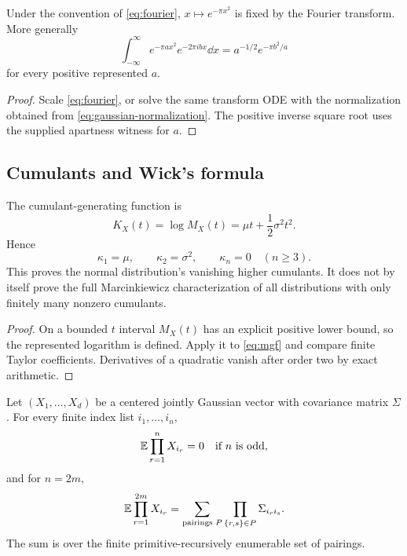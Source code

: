 \begin{corollary}\label{cor:self-fourier}
Under the convention of \eqref{eq:fourier}, $x\mapsto e^{-\pi x^2}$ is fixed by the Fourier transform.  More generally
\[
 \int_{-\infty}^{\infty}e^{-\pi a x^2}e^{-2\pi ibx}\dd x
 =a^{-1/2}e^{-\pi b^2/a}
\]
for every positive represented $a$.
\end{corollary}

\begin{proof}
Scale \eqref{eq:fourier}, or solve the same transform ODE with the normalization obtained from \eqref{eq:gaussian-normalization}.  The positive inverse square root uses the supplied apartness witness for $a$.
\end{proof}

\subsection{Cumulants and Wick's formula}

\begin{corollary}[Cumulants]\label{cor:cumulants}
The cumulant-generating function is
\begin{equation}\label{eq:cgf}
 K_X(t)=\log M_X(t)=\mu t+\frac12\sigma^2t^2.
\end{equation}
Hence
\[
 \kappa_1=\mu,\qquad \kappa_2=\sigma^2,
 \qquad \kappa_n=0\quad(n\ge3).
\]
This proves the normal distribution's vanishing higher cumulants.  It does not by itself prove the full Marcinkiewicz characterization of all distributions with only finitely many nonzero cumulants.
\end{corollary}

\begin{proof}
On a bounded $t$ interval $M_X(t)$ has an explicit positive lower bound, so the represented logarithm is defined.  Apply it to \eqref{eq:mgf} and compare finite Taylor coefficients.  Derivatives of a quadratic vanish after order two by exact arithmetic.
\end{proof}

\begin{theorem}\label{thm:wick}
Let $(X_1,\dots,X_d)$ be a centered jointly Gaussian vector with covariance matrix $\Sigma$.  For every finite index list $i_1,\dots,i_n$,
\[
 \mathbb E\prod_{r=1}^nX_{i_r}=0\quad\text{if $n$ is odd},
\]
and for $n=2m$,
\begin{equation}\label{eq:wick}
 \mathbb E\prod_{r=1}^{2m}X_{i_r}
 =\sum_{\text{pairings }P}\prod_{\{r,s\}\in P}\Sigma_{i_r i_s}.
\end{equation}
The sum is over the finite primitive-recursively enumerable set of pairings.
\end{theorem}

